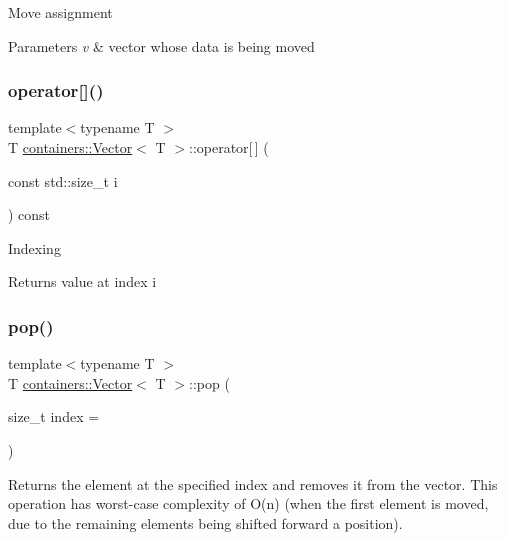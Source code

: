 Move assignment


\begin{DoxyParams}{Parameters}
{\em v} & vector whose data is being moved \\
\hline
\end{DoxyParams}
\mbox{\label{classcontainers_1_1_vector_a8dcbd38c932f114a8237785f8272712f}} 
\subsubsection{\texorpdfstring{operator[]()}{operator[]()}}
{\footnotesize\ttfamily template$<$typename T $>$ \\
T \hyperlink{classcontainers_1_1_vector}{containers\+::\+Vector}$<$ T $>$\+::operator\mbox{[}$\,$\mbox{]} (\begin{DoxyParamCaption}\item[{const std\+::size\+\_\+t}]{i }\end{DoxyParamCaption}) const\hspace{0.3cm}{\ttfamily [inline]}}

Indexing

\begin{DoxyReturn}{Returns}
value at index {\ttfamily i} 
\end{DoxyReturn}
\mbox{\label{classcontainers_1_1_vector_a35cb0393f7ba3bc682c1a58a20471a69}} 
\subsubsection{\texorpdfstring{pop()}{pop()}}
{\footnotesize\ttfamily template$<$typename T $>$ \\
T \hyperlink{classcontainers_1_1_vector}{containers\+::\+Vector}$<$ T $>$\+::pop (\begin{DoxyParamCaption}\item[{size\+\_\+t}]{index = {} }\end{DoxyParamCaption})\hspace{0.3cm}{\ttfamily [inline]}}

Returns the element at the specified index and removes it from the vector. This operation has worst-\/case complexity of O(n) (when the first element is moved, due to the remaining elements being shifted forward a position).


